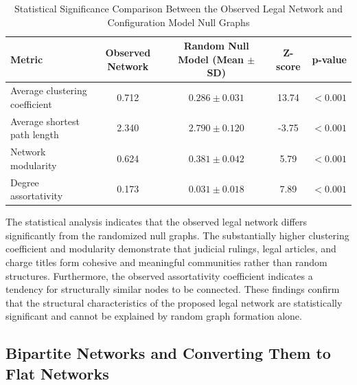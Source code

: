 \documentclass[twoside]{article}
\begin{document}
\begin{table}[!ht]
	\begin{center}
		\small
		\caption{Statistical Significance Comparison Between the Observed Legal Network and Configuration Model Null Graphs}\vspace{-0.45cm}
		\label{tab3}
		\begin{tabular}{lcccc}
			\hline
			\textbf{Metric} & \textbf{Observed Network} & \textbf{Random Null Model (Mean $\pm$ SD)} & \textbf{Z-score} & \textbf{p-value} \\
			\hline
			Average clustering coefficient & 0.712 & $0.286 \pm 0.031$ & 13.74 & $< 0.001$ \\
			Average shortest path length & 2.340 & $2.790 \pm 0.120$ & -3.75 & $< 0.001$ \\
			Network modularity & 0.624 & $0.381 \pm 0.042$ & 5.79 & $< 0.001$ \\
			Degree assortativity & 0.173 & $0.031 \pm 0.018$ & 7.89 & $< 0.001$ \\
			\hline
		\end{tabular}
	\end{center}\vspace{-0.6cm}
\end{table}
\noindent The statistical analysis indicates that the observed legal network differs significantly from the randomized null graphs. The substantially higher clustering coefficient and modularity demonstrate that judicial rulings, legal articles, and charge titles form cohesive and meaningful communities rather than random structures. Furthermore, the observed assortativity coefficient indicates a tendency for structurally similar nodes to be connected. These findings confirm that the structural characteristics of the proposed legal network are statistically significant and cannot be explained by random graph formation alone.

\subsection{Bipartite Networks and Converting Them to Flat Networks}
\end{document}

